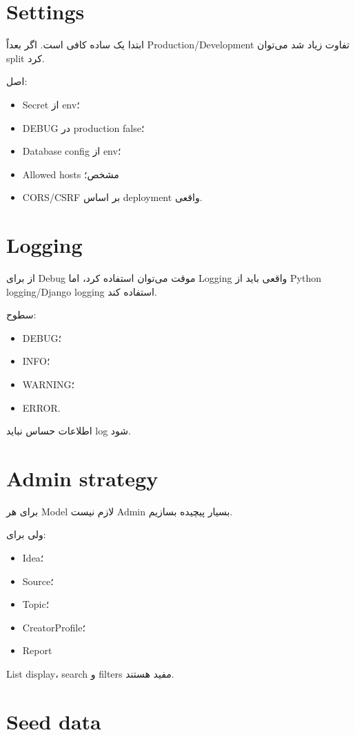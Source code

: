 \section{Settings}

ابتدا یک  ساده کافی است. اگر بعداً Production/Development تفاوت زیاد شد می‌توان split کرد.

اصل:
\begin{itemize}
  \item Secret از env؛
  \item DEBUG در production false؛
  \item Database config از env؛
  \item Allowed hosts مشخص؛
  \item CORS/CSRF بر اساس deployment واقعی.
\end{itemize}

\section{Logging}

از  برای Debug موقت می‌توان استفاده کرد، اما Logging واقعی باید از Python logging/Django logging استفاده کند.

سطوح:
\begin{itemize}
  \item DEBUG؛
  \item INFO؛
  \item WARNING؛
  \item ERROR.
\end{itemize}

اطلاعات حساس نباید log شود.

\section{Admin strategy}

برای هر Model لازم نیست Admin بسیار پیچیده بسازیم.

ولی برای:
\begin{itemize}
  \item Idea؛
  \item Source؛
  \item Topic؛
  \item CreatorProfile؛
  \item Report
\end{itemize}
List display، search و filters مفید هستند.

\section{Seed data}

